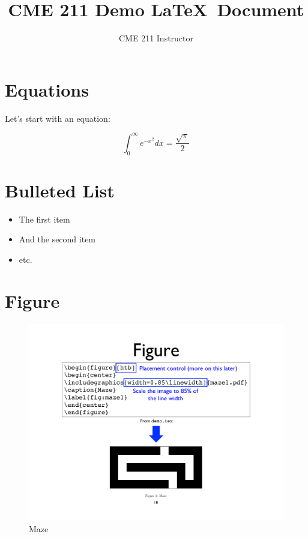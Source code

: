 \documentclass{article}
\title{CME 211 Demo \LaTeX\ Document}
\author{CME 211 Instructor}
\begin{document}
\maketitle

\section{Equations}

Let's start with an equation:

\begin{equation}
\int_0^\infty e^{-x^2} dx=\frac{\sqrt{\pi}}{2}
\end{equation}

\section{Bulleted List}

\begin{itemize}
\item The first item
\item And the second item
\item etc.
\end{itemize}

\section{Figure}

\begin{figure}[h]
\begin{center}
\includegraphics[width=0.85\linewidth]{../fig/maze.pdf}
\caption{Maze}
\label{fig:maze}
\end{center}
\end{figure}
\end{document}
